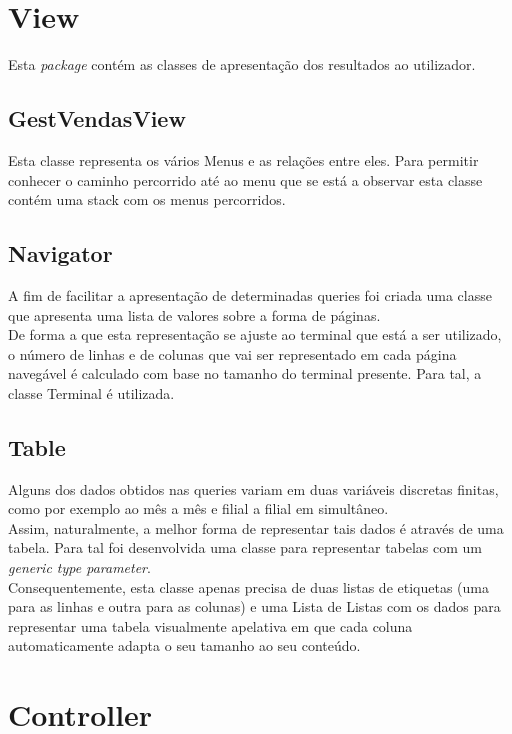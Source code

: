 \documentclass[a4paper]{report}
\begin{document}
\section{View}

Esta \textit{package} contém as classes de apresentação dos resultados ao utilizador.

\subsection{GestVendasView}

Esta classe representa os vários Menus e as relações entre eles. Para permitir
conhecer o caminho percorrido até ao menu que se está a observar esta classe
contém uma stack com os menus percorridos.

\subsection{Navigator}

A fim de facilitar a apresentação de determinadas queries foi criada uma classe que 
apresenta uma lista de valores sobre a forma de páginas.\\
De forma a que esta representação se ajuste ao terminal que está a ser utilizado, 
o número de linhas e de colunas que vai ser representado em cada página navegável 
é calculado com base no tamanho do terminal presente. Para tal, a classe Terminal 
é utilizada.

\subsection{Table}

Alguns dos dados obtidos nas queries variam em duas variáveis discretas finitas, como por exemplo
ao mês a mês e filial a filial em simultâneo.\\
Assim, naturalmente, a melhor forma de representar tais dados é através de uma tabela.
Para tal foi desenvolvida uma classe para representar tabelas com um 
\textit{generic type parameter}.\\
Consequentemente, esta classe apenas precisa de duas listas de etiquetas (uma 
para as linhas e outra para as colunas) e uma Lista de Listas com os dados para 
representar uma tabela visualmente apelativa em que cada coluna automaticamente 
adapta o seu tamanho ao seu conteúdo.

\section{Controller}
\end{document}
